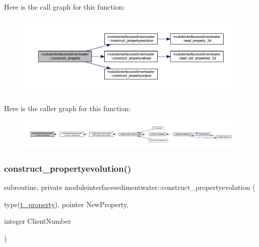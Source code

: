 Here is the call graph for this function\+:\nopagebreak
\begin{figure}[H]
\begin{center}
\leavevmode
\includegraphics[width=350pt]{namespacemoduleinterfacesedimentwater_a7388cf4b98f85f5b8bc80f3e59724650_cgraph}
\end{center}
\end{figure}
Here is the caller graph for this function\+:\nopagebreak
\begin{figure}[H]
\begin{center}
\leavevmode
\includegraphics[width=350pt]{namespacemoduleinterfacesedimentwater_a7388cf4b98f85f5b8bc80f3e59724650_icgraph}
\end{center}
\end{figure}
\mbox{\label{namespacemoduleinterfacesedimentwater_a6336ff1fc78b8fe728b00770c5b311b0}} 
\subsubsection{\texorpdfstring{construct\+\_\+propertyevolution()}{construct\_propertyevolution()}}
{\footnotesize\ttfamily subroutine, private moduleinterfacesedimentwater\+::construct\+\_\+propertyevolution (\begin{DoxyParamCaption}\item[{type(\mbox{\hyperlink{structmoduleinterfacesedimentwater_1_1t__property}{t\+\_\+property}}), pointer}]{New\+Property,  }\item[{integer}]{Client\+Number }\end{DoxyParamCaption})\hspace{0.3cm}{\ttfamily [private]}}

